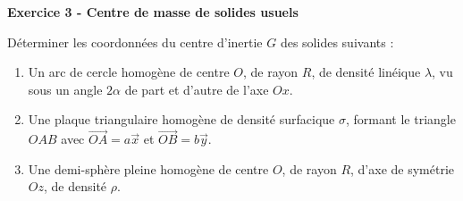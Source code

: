 \documentclass[12pt,a4paper]{article}
\begin{document}
\begin{boiteexercice}
\textbf{Exercice 3 - Centre de masse de solides usuels}\niveau{\moyen}

Déterminer les coordonnées du centre d'inertie $G$ des solides suivants :
\begin{enumerate}
  \item Un arc de cercle homogène de centre $O$, de rayon $R$, de densité linéique $\lambda$, vu sous un angle $2\alpha$ de part et d'autre de l'axe $Ox$.
  \item Une plaque triangulaire homogène de densité surfacique $\sigma$, formant le triangle $OAB$ avec $\overrightarrow{OA} = a\vec{x}$ et $\overrightarrow{OB} = b\vec{y}$.
  \item Une demi-sphère pleine homogène de centre $O$, de rayon $R$, d'axe de symétrie $Oz$, de densité $\rho$.
\end{enumerate}
\end{boiteexercice}
\end{document}
